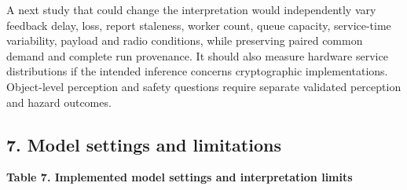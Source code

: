 \documentclass[
]{article}
\begin{document}
A next study that could change the interpretation would independently
vary feedback delay, loss, report staleness, worker count, queue
capacity, service-time variability, payload and radio conditions, while
preserving paired common demand and complete run provenance. It should
also measure hardware service distributions if the intended inference
concerns cryptographic implementations. Object-level perception and
safety questions require separate validated perception and hazard
outcomes.

\subsection{7. Model settings and
limitations}\label{model-settings-and-limitations}

\textbf{Table 7. Implemented model settings and interpretation limits}
\end{document}
